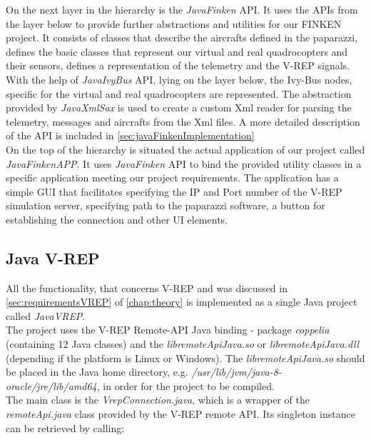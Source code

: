 On the next layer in the hierarchy is the \textit{JavaFinken} API. 
It uses the APIs from the layer below to provide further abstractions and utilities for our FINKEN project. 
It consists of classes that describe 
the aircrafts defined in the paparazzi, defines the basic classes that represent our virtual and real quadrocopters and their sensors, defines a representation of the telemetry and the V-REP signals. 
With the help of \textit{JavaIvyBus} API, lying on the layer below, the Ivy-Bus nodes, specific for the virtual and real quadrocopters are represented. 
The abstraction provided by \textit{JavaXmlSax} is used to create a custom Xml reader for parsing the telemetry, messages and aircrafts from the Xml files. 
A more detailed description of the API is included in \ref{sec:javaFinkenImplementation} \\

On the top of the hierarchy is situated the actual application of our project called \textit{JavaFinkenAPP}. It uses \textit{JavaFinken} API to bind the provided utility classes in a specific application meeting our project requirements. 
The application has a simple \gls{GUI} that facilitates specifying the IP and Port number of the V-REP simulation server, specifying path to the paparazzi software, a button for establishing the connection and other UI elements.




\subsection{Java V-REP}
\label{sec:vrepImplementation}

All the functionality, that concerns V-REP and was discussed in \ref{sec:requirementsVREP} of \ref{chap:theory} is implemented as a single Java project called \textit{JavaVREP}.\\
 The project uses the V-REP Remote-API Java binding - package \textit{coppelia} (containing 12 Java classes) and the \textit{libremoteApiJava.so} or \textit{libremoteApiJava.dll} (depending if the platform is Linux or Windows). The \textit{libremoteApiJava.so} should be placed in the Java home directory, e.g. \textit{/usr/lib/jvm/java-8-oracle/jre/lib/amd64}, in order for the project to be compiled.\\
The main class is the \textit{VrepConnection.java}, which is a wrapper of the \textit{remoteApi.java} class provided by the V-REP remote API. Its singleton instance can be retrieved by calling:

